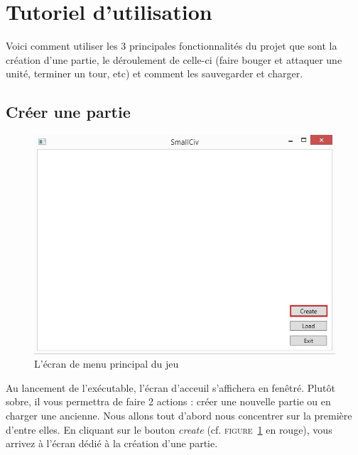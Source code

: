 \section{Tutoriel d'utilisation}
Voici comment utiliser les 3 principales fonctionnalités du projet que sont la création d'une partie, le déroulement de celle-ci (faire bouger et attaquer une unité, terminer un tour, etc) et comment les sauvegarder et charger. 

\subsection{Créer une partie}
\begin{figure}[h]
	\centering
	\includegraphics{img/acceuil_to_creation.jpg}
	\caption{L'écran de menu principal du jeu}
	\label{start}
\end{figure}
Au lancement de l'exécutable, l'écran d'acceuil s'affichera en fenêtré. Plutôt sobre, il vous permettra de faire 2 actions : créer une nouvelle partie ou en charger une ancienne. Nous allons tout d'abord nous concentrer sur la première d'entre elles. En cliquant sur le bouton \emph{create} (cf. \textsc{figure~\ref{start}} en rouge), vous arrivez à l'écran dédié à la création d'une partie.\newline

